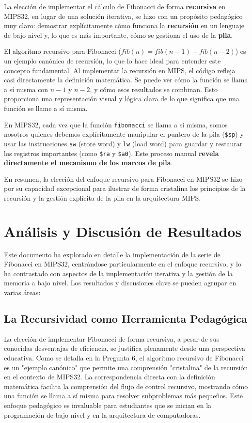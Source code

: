 \documentclass{article}
\begin{document}
La elección de implementar el cálculo de Fibonacci de forma \textbf{recursiva} en MIPS32, en lugar de una solución iterativa, se hizo con un propósito pedagógico muy claro: demostrar explícitamente cómo funciona la \textbf{recursión} en un lenguaje de bajo nivel y, lo que es más importante, cómo se gestiona el uso de la \textbf{pila}.

El algoritmo recursivo para Fibonacci ($fib(n) = fib(n-1) + fib(n-2)$) es un ejemplo canónico de recursión, lo que lo hace ideal para entender este concepto fundamental. Al implementar la recursión en MIPS, el código refleja casi directamente la definición matemática. Se puede ver cómo la función se llama a sí misma con $n-1$ y $n-2$, y cómo esos resultados se combinan. Esto proporciona una representación visual y lógica clara de lo que significa que una función se llame a sí misma.

En MIPS32, cada vez que la función \texttt{fibonacci} se llama a sí misma, somos nosotros quienes debemos explícitamente manipular el puntero de la pila (\texttt{\$sp}) y usar las instrucciones \texttt{sw} (store word) y \texttt{lw} (load word) para guardar y restaurar los registros importantes (como \texttt{\$ra} y \texttt{\$a0}). Este proceso manual \textbf{revela directamente el mecanismo de los marcos de pila}.

En resumen, la elección del enfoque recursivo para Fibonacci en MIPS32 se hizo por su capacidad excepcional para ilustrar de forma cristalina los principios de la recursión y la gestión explícita de la pila en la arquitectura MIPS.

\section*{Análisis y Discusión de Resultados}

Este documento ha explorado en detalle la implementación de la serie de Fibonacci en MIPS32, centrándose particularmente en el enfoque recursivo, y lo ha contrastado con aspectos de la implementación iterativa y la gestión de la memoria a bajo nivel. Los resultados y discusiones clave se pueden agrupar en varias áreas:

\subsection*{\Large La Recursividad como Herramienta Pedagógica}
La elección de implementar Fibonacci de forma recursiva, a pesar de sus conocidas desventajas de eficiencia, se justifica plenamente desde una perspectiva educativa. Como se detalla en la Pregunta 6, el algoritmo recursivo de Fibonacci es un "ejemplo canónico" que permite una comprensión "cristalina" de la recursión en el contexto de MIPS32. La correspondencia directa con la definición matemática facilita la comprensión del flujo de control recursivo, mostrando cómo una función se llama a sí misma para resolver subproblemas más pequeños. Este enfoque pedagógico es invaluable para estudiantes que se inician en la programación de bajo nivel y en la arquitectura de computadoras.
\end{document}

